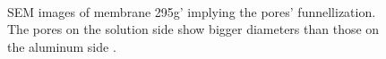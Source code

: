 \documentclass[../thesis.tex]{subfiles}
\begin{document}
        

        \begin{figure}[p]
          \centering
          \\
          \caption{SEM images of membrane 295g' implying the pores' funnellization. The pores on the solution side \protect{} show bigger diameters than those on the aluminum side \protect{}.}
          \label{fig:295g-sem-funnellization-proof}
        \end{figure}
\end{document}
